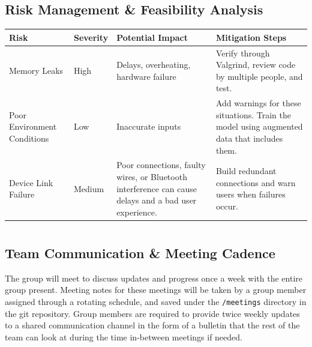 \documentclass{article}
\newcommand{\partsection}{%
    \section[Part \Roman{section}]{}
}
\begin{document}
\subsection{Risk Management \& Feasibility Analysis}


\begin{tabularx}{\textwidth}{|l|l|X|X|}
\hline
\textbf{Risk} & \textbf{Severity} & \textbf{Potential Impact} & \textbf{Mitigation Steps} \\
\hline
Memory Leaks & High &
Delays, overheating, hardware failure &
Verify through Valgrind, review code by multiple people, and test. \\
\hline
Poor Environment Conditions & Low &
Inaccurate inputs &
Add warnings for these situations. Train the model using augmented data that includes them. \\
\hline
Device Link Failure & Medium &
Poor connections, faulty wires, or Bluetooth interference can cause delays and a bad user experience. &
Build redundant connections and warn users when failures occur. \\
\hline
\end{tabularx}

% 




\partsection{}

\subsection{Team Communication \& Meeting Cadence}

The group will meet to discuss updates and progress once a week with the entire group present. Meeting notes for these meetings will be taken by a group member assigned through a rotating schedule, and saved under the \texttt{/meetings} directory in the git repository. Group members are required to provide twice weekly updates to a shared communication channel in the form of a bulletin that the rest of the team can look at during the time in-between meetings if needed.
\end{document}
